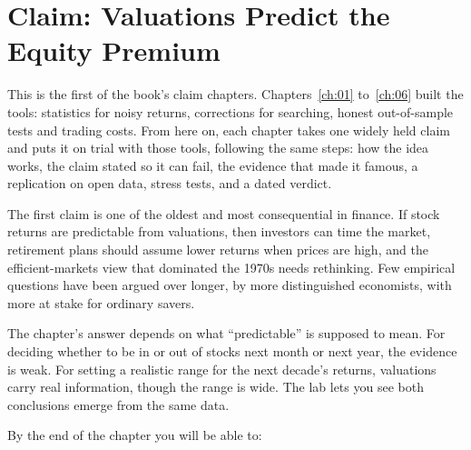 \chapter{Claim: Valuations Predict the Equity Premium}
\label{ch:07}

This is the first of the book's claim chapters. Chapters~\ref{ch:01} to~\ref{ch:06} built the tools: statistics for noisy returns, corrections for searching, honest out-of-sample tests and trading costs. From here on, each chapter takes one widely held claim and puts it on trial with those tools, following the same steps: how the idea works, the claim stated so it can fail, the evidence that made it famous, a replication on open data, stress tests, and a dated verdict.

The first claim is one of the oldest and most consequential in finance. If stock returns are predictable from valuations, then investors can time the market, retirement plans should assume lower returns when prices are high, and the efficient-markets view that dominated the 1970s needs rethinking. Few empirical questions have been argued over longer, by more distinguished economists, with more at stake for ordinary savers.

The chapter's answer depends on what ``predictable'' is supposed to mean. For deciding whether to be in or out of stocks next month or next year, the evidence is weak. For setting a realistic range for the next decade's returns, valuations carry real information, though the range is wide. The lab lets you see both conclusions emerge from the same data.

By the end of the chapter you will be able to:

